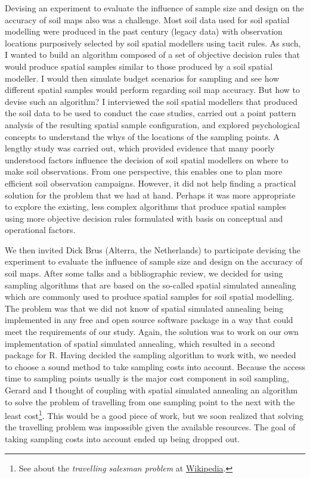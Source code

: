 Devising an experiment to evaluate the influence of sample size and design on the accuracy of soil maps also 
was a challenge. Most soil data used for soil spatial modelling were produced in the past century (legacy data) 
with observation locations purposively selected by soil spatial modellers using tacit rules. As such, I wanted 
to build an algorithm composed of a set of objective decision rules that would produce spatial samples similar 
to those produced by a soil spatial modeller. I would then simulate budget scenarios for sampling and see how 
different spatial samples would perform regarding soil map accuracy. But how to devise such an algorithm? I 
interviewed the soil spatial modellers that produced the soil data to be used to conduct the case studies, 
carried out a point pattern analysis of the resulting spatial sample configuration, and explored psychological 
concepts to understand the whys of the locations of the sampling points. A lengthy study was carried out, which 
provided evidence that many poorly understood factors influence the decision of soil spatial modellers on where 
to make soil observations. From one perspective, this enables one to plan more efficient soil observation 
campaigns. However, it did not help finding a practical solution for the problem that we had at hand. Perhaps 
it was more appropriate to explore the existing, less complex algorithms that produce spatial samples using 
more objective decision rules formulated with basis on conceptual and operational factors.

\def\foottravel{\footnote{See about the \emph{travelling salesman problem} at 
\href{https://en.wikipedia.org/wiki/Travelling_salesman_problem}{Wikipedia}.}}

We then invited Dick Brus (Alterra, the Netherlands) to participate devising the experiment to evaluate the 
influence of sample size and design on the accuracy of soil maps. After some talks and a bibliographic review, 
we decided for using sampling algorithms that are based on the so-called spatial simulated annealing which are 
commonly used to produce spatial samples for soil spatial modelling. The problem was that we did not know of 
spatial simulated annealing being implemented in any free and open source software package in a way that could 
meet the requirements of our study. Again, the solution was to work on our own implementation of spatial 
simulated annealing, which resulted in a second package for R. Having decided the sampling algorithm to 
work with, we needed to choose a sound method to take sampling costs into account. Because the access time to 
sampling points usually is the major cost component in soil sampling, Gerard and I thought of coupling with 
spatial simulated annealing an algorithm to solve the problem of travelling from one sampling point to the next 
with the least cost\foottravel. This would be a good piece of work, but we soon realized that solving the 
travelling problem was impossible given the available resources. The goal of taking sampling costs into account 
ended up being dropped out.

